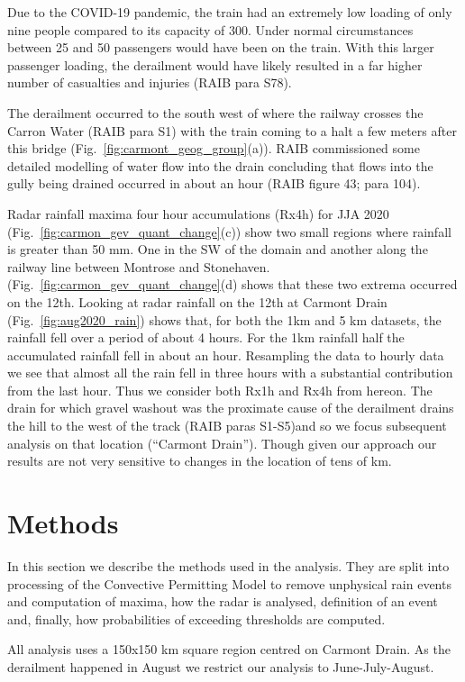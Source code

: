 \documentclass[11pt,a4paper]{article}
\begin{document}
Due to the COVID-19 pandemic, the train had an extremely low loading of only nine people compared to its capacity of 300. Under normal circumstances between 25 and 50 passengers would have been on the train. With this larger passenger loading, the derailment would have likely resulted in a far higher number of casualties and injuries (RAIB para S78). 

The derailment occurred to the south west of where the railway crosses the Carron Water (RAIB para S1) with the train coming to a halt a few meters after this bridge (Fig.~\ref{fig:carmont_geog_group}(a)).  RAIB commissioned some detailed modelling of water flow into the drain concluding that  flows into the gully being drained occurred in about an hour (RAIB figure 43; para 104). 




Radar rainfall maxima four hour accumulations (Rx4h) for JJA 2020 (Fig.~\ref{fig:carmon_gev_quant_change}(c)) show two small regions  where rainfall is greater than 50 mm. One in the SW of the domain and another along the railway line between Montrose and Stonehaven. (Fig.~\ref{fig:carmon_gev_quant_change}(d) shows that these two extrema occurred on the 12th. Looking at radar rainfall on the 12th at Carmont Drain (Fig.~\ref{fig:aug2020_rain}) shows that, for both the 1km and 5 km datasets, the rainfall fell over a period of about 4 hours. For the 1km rainfall half the accumulated rainfall fell in about an hour.  Resampling the data to hourly data we see that almost all the rain fell in three hours with a substantial contribution from the last hour.  Thus we consider both Rx1h and Rx4h from hereon. The drain for which gravel washout was the proximate cause of the derailment drains the hill to the west of the track (RAIB paras S1-S5)and so we focus subsequent analysis on that location (``Carmont Drain''). Though given our approach our results are not very sensitive to changes in the location of tens of km.  

\section{Methods}
In this section we describe the methods used in the analysis. They are split into processing of the Convective Permitting Model to remove unphysical rain events  and computation of maxima, how the radar is analysed, definition of an event and, finally, how probabilities of exceeding thresholds are computed. 

All analysis uses a 150x150 km square region centred on  Carmont Drain. As the derailment happened in August we restrict our analysis to June-July-August. 
\end{document}
